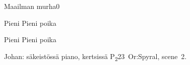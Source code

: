 \documentclass[11pt,a4paper]{article}
\begin{document}
\begin{mysong}{Maailman murha}{0}

\begin{SBChorus}
Pieni     Pieni poika
  
\end{SBChorus}


\begin{SBChorus}
Pieni     Pieni poika
  
\end{SBChorus}


{\SBLyricNoteFont Johan: säkeistössä piano, kertsissä
P\textsubscript{2}23~Or:Spyral, scene~2.}

\end{mysong}
\end{document}
